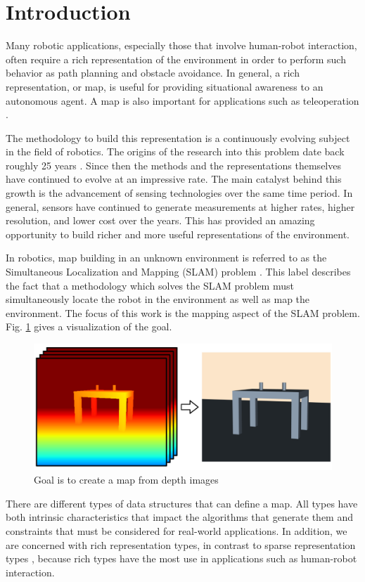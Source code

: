 
\section{Introduction} \label{sec:introduction}

Many robotic applications, especially those that involve human-robot
interaction, often require a rich representation of the environment in order to
perform such behavior as path planning and obstacle avoidance. In general, a
rich representation, or map, is useful for providing situational awareness to an
autonomous agent. A map is also important for applications such as teleoperation
\cite{Kadous2006}.

The methodology to build this representation is a continuously evolving subject
in the field of robotics. The origins of the research into this problem date
back roughly 25 years \cite{Lorensen1987}. Since then the methods and the
representations themselves have continued to evolve at an impressive rate. The
main catalyst behind this growth is the advancement of sensing technologies over
the same time period. In general, sensors have continued to generate
measurements at higher rates, higher resolution, and lower cost over the years.
This has provided an amazing opportunity to build richer and more useful
representations of the environment.

In robotics, map building in an unknown environment is referred to as the
Simultaneous Localization and Mapping (SLAM) problem \cite{Thrun2002}. This
label describes the fact that a methodology which solves the SLAM problem must
simultaneously locate the robot in the environment as well as map the
environment. The focus of this work is the mapping aspect of the SLAM problem.
Fig. \ref{fig:goal} gives a visualization of the goal.

\begin{figure}[h]%
\centering
\includegraphics[width=.45\textwidth]{figures/diagram_goal.png}
\caption{Goal is to create a map from depth images}
\label{fig:goal}
\end{figure}

There are different types of data structures that can define a map. All types have both
intrinsic characteristics that impact the algorithms that generate them and
constraints that must be considered for real-world applications. In
addition, we are concerned with rich representation types, in contrast to sparse
representation types \cite{Dissanayake2001}, because rich types have the most
use in applications such as human-robot interaction.

